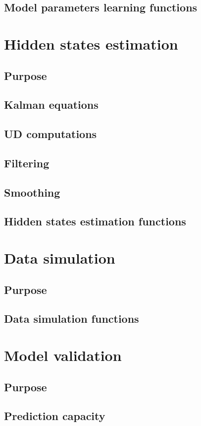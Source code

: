 \documentclass{book}
\begin{document}
\section{Model parameters learning functions}
\newpage

\chapter{Hidden states estimation}
\section{Purpose}
\section{Kalman equations}
\section{UD computations}
\section{Filtering}
\section{Smoothing}
\section{Hidden states estimation functions}
\newpage

\chapter{Data simulation}
\section{Purpose}
\section{Data simulation functions}
\newpage

\chapter{Model validation}
\section{Purpose}
\section{Prediction capacity}
\end{document}
